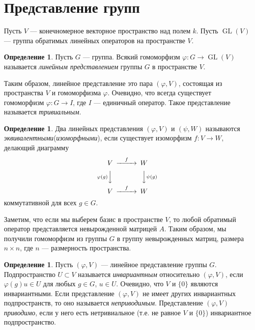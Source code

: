 \documentclass[12pt, titlepage, oneside]{amsbook}
\newcommand{\GL}{\operatorname{GL}}
\theoremstyle{definition}
\newtheorem{definition}[theorem]{Определение}
\theoremstyle{remark}
\begin{document}


\section{Представление групп}

Пусть $V$ --- конечномерное векторное пространство над полем $k$. Пусть $\GL(V)$ --- группа обратимых линейных операторов на пространстве $V$.

\begin{definition}
	Пусть $G$ --- группа. Всякий гомоморфизм $\varphi\colon G\rightarrow\GL(V)$ называется \emph{линейным представлением} группы $G$ в пространстве $V$.
\end{definition}

Таким образом, линейное представление это пара $(\varphi,V)$, состоящая из пространства $V$ и гомоморфизма $\varphi$. Очевидно, что всегда существует гомоморфизм $\varphi\colon G\rightarrow I$, где $I$ --- единичный оператор. Такое представление называется \emph{тривиальным}.

\begin{definition}
	Два линейных представления $(\varphi,V)$ и $(\psi,W)$ называются \emph{эквивалентными}(\emph{изоморфными}), если существует изоморфизм $f\colon V\rightarrow W$, делающий диаграмму $$\begin{CD}V@>f>> W\\
			@V\varphi(g)VV @VV\psi(g)V\\
			V@>f>>W\end{CD}$$ коммутативной для всех $g\in G$.
\end{definition}

Заметим, что если мы выберем базис в пространстве $V$, то любой обратимый оператор представляется невырожденной матрицей $A$. Таким образом, мы получили гомоморфизм из группы $G$ в группу невырожденных матриц, размера $n\times n$, где $n$ --- размерность пространства.

\begin{definition}
	Пусть $(\varphi,V)$ --- линейное представление группы $G$. Подпространство $U\subset V$ называется \emph{инвариантным} относительно $(\varphi,V)$, если $\varphi(g)u\in U$ для любых $g\in G$, $u\in U$. Очевидно, что $V$ и $\{0\}$ являются инвариантными. Если представление $(\varphi,V)$ не имеет других инвариантных подпространств, то оно называется \emph{неприводимым}. Представление $(\varphi,V)$ \emph{приводимо}, если у него есть нетривиальное (т.е. не равное $V$ и $\{0\}$) инвариантное подпространство.
\end{definition}
\end{document}
